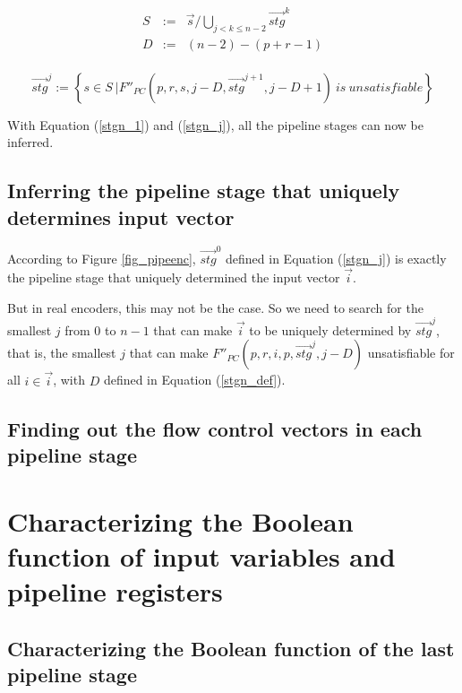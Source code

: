 \documentclass[runningheads,a4paper,orivec]{llncs}
\begin{document}
\begin{equation}\label{stgn_def}
\begin{array}{ccc}
S             & := & \vec{s}/\bigcup_{j<k\le n-2}\vec{stg}^{k}\\
D             & := & (n-2)-(p+r-1)\\
\end{array}
\end{equation}

\begin{equation}\label{stgn_j}
\vec{stg}^{j} := 
 \left\{
 s\in S ~| 
 F''_{PC}(p,r,s,j-D,\vec{stg}^{j+1},j-D+1)
 ~is~unsatisfiable
\right\}
\end{equation}

With Equation (\ref{stgn_1}) and (\ref{stgn_j}),
all the pipeline stages can now be inferred.

\subsection{Inferring the pipeline stage that uniquely determines input vector}\label{subsec_inferinput}

According to Figure \ref{fig_pipeenc},
$\vec{stg}^0$ defined in Equation (\ref{stgn_j}) is
exactly the pipeline stage that uniquely determined the input vector $\vec{i}$.

But in real encoders,
this may not be the case.
So we need to search for the smallest $j$ from $0$ to $n-1$ that can make $\vec{i}$ to be uniquely determined by $\vec{stg}^j$,
that is,
the smallest $j$ that can make $F''_{PC}(p,r,i,p,\vec{stg}^{j},j-D)$ unsatisfiable for all $i\in \vec{i}$,
with $D$ defined in Equation (\ref{stgn_def}).

\subsection{Finding out the flow control vectors in each pipeline stage}

\section{Characterizing the Boolean function of input variables and pipeline registers}\label{sec_char}
\subsection{Characterizing the Boolean function of the last pipeline stage}
\end{document}
